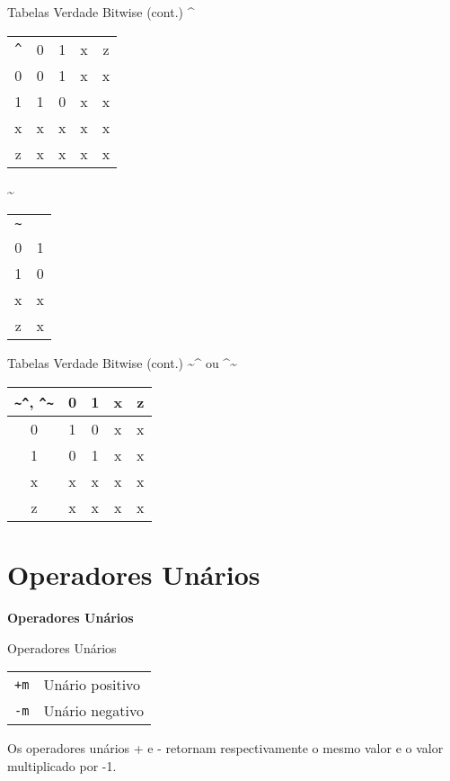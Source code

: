 \documentclass[aspectratio=169,xcolor=dvipsnames]{beamer}
\begin{document}
\begin{frame}[fragile]{Tabelas Verdade Bitwise (cont.)}
\textbf{\^}
\begin{tabular}{ccccc}
\texttt{\^} & 0 & 1 & x & z \\
0 & 0 & 1 & x & x \\
1 & 1 & 0 & x & x \\
x & x & x & x & x \\
z & x & x & x & x \\
\end{tabular}

\vspace{1em}
\textbf{\textasciitilde}
\begin{tabular}{cc}
\texttt{\~} &   \\
0 & 1 \\
1 & 0 \\
x & x \\
z & x \\
\end{tabular}
\end{frame}

\begin{frame}[fragile]{Tabelas Verdade Bitwise (cont.)}
\textbf{\textasciitilde\textasciicircum} ou \textbf{\textasciicircum\textasciitilde}
\begin{tabular}{ccccc}
\texttt{\textasciitilde\textasciicircum}, \texttt{\textasciicircum\textasciitilde} & 0 & 1 & x & z \\
\hline
0 & 1 & 0 & x & x \\
1 & 0 & 1 & x & x \\
x & x & x & x & x \\
z & x & x & x & x \\
\end{tabular}
\end{frame}

\section{Operadores Unários}

\begin{frame}
    \Huge{\centerline{\textbf{Operadores Unários}}}
\end{frame}

\begin{frame}[fragile]{Operadores Unários}
\begin{tabular}{ll}
\texttt{+m} & Unário positivo \\
\texttt{-m} & Unário negativo \\
\end{tabular}

Os operadores unários + e - retornam respectivamente o mesmo valor e o valor multiplicado por -1.
\end{frame}
\end{document}
